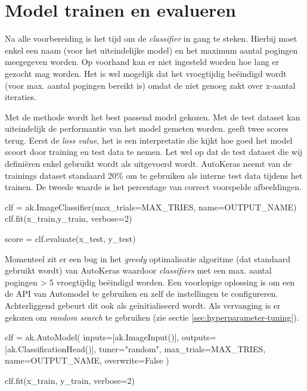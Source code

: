 \section{Model trainen en evalueren}
\label{sec:traineval-autokeras}

Na alle voorbereiding is het tijd om de \textit{classifier} in gang te steken. Hierbij moet enkel een naam (voor het uiteindelijke model) en het maximum aantal pogingen meegegeven worden. Op voorhand kan er niet ingesteld worden hoe lang er gezocht mag worden. Het is wel mogelijk dat het vroegtijdig beëindigd wordt (voor max. aantal pogingen bereikt is) omdat de  niet genoeg zakt over x-aantal iteraties.

Met de  methode wordt het best passend model gekozen. Met de test dataset kan uiteindelijk de performantie van het model gemeten worden.  geeft twee scores terug. Eerst de \textit{loss value}, het is een interpretatie die kijkt hoe goed het model scoort door training en test data te nemen. Let wel op dat de test dataset die wij definiëren enkel gebruikt wordt als  uitgevoerd wordt. AutoKeras neemt van de trainings dataset standaard 20\% om te gebruiken als interne test data tijdens het trainen. De tweede waarde is het percentage van correct voorspelde afbeeldingen.

\bigskip

\begin{python}
clf = ak.ImageClassifier(max_trials=MAX_TRIES, name=OUTPUT_NAME)
clf.fit(x_train,y_train, verbose=2)

score = clf.evaluate(x_test, y_test)
\end{python}

Momenteel zit er een bug in het \textit{greedy} optimalisatie algoritme (dat standaard gebruikt wordt) van AutoKeras waardoor \textit{classifiers} met een max. aantal pogingen > 5 vroegtijdig beëindigd worden. Een voorlopige oplossing is om een de API van Automodel te gebruiken en zelf de instellingen te configureren. Achterliggend gebeurt dit ook als  geïnitialiseerd wordt. Als vervanging is er gekozen om \textit{random search} te gebruiken (zie sectie \ref{sec:hyperparameter-tuning}).

\bigskip

\begin{python}
clf = ak.AutoModel(
    inputs=[ak.ImageInput()], 
    outputs=[ak.ClassificationHead()], 
    tuner="random",
    max_trials=MAX_TRIES, 
    name=OUTPUT_NAME,
    overwrite=False
    )
    
clf.fit(x_train, y_train, verbose=2)
\end{python}

